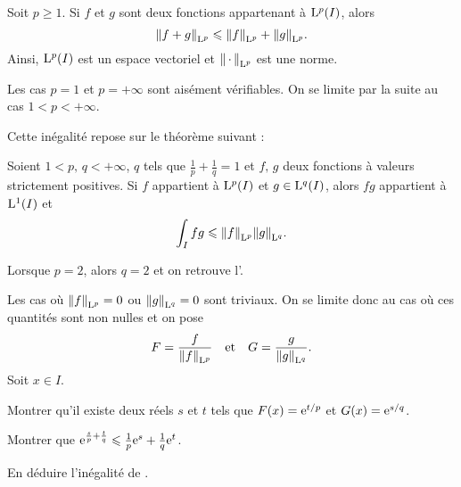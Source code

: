 \begin{theo}
Soit $p \geqslant 1$. Si $f$ et $g$ sont deux fonctions appartenant à $\mathrm{L}^p(I)$, alors
\[
\norm{f + g}_{\mathrm{L}^p} \leqslant \norm{f}_{\mathrm{L}^p} + \norm{g}_{\mathrm{L}^p}.
\]
Ainsi, $\mathrm{L}^p(I)$ est un espace vectoriel et $\norm{\,\cdot\,}_{\mathrm{L}^p}$ est une norme.
\end{theo}

\begin{remarque}
Les cas $p = 1$ et $p = +\infty$ sont aisément vérifiables. On se limite par la suite au cas $1 < p < +\infty$.
\end{remarque}

Cette inégalité repose sur le théorème suivant :
\begin{theo}
Soient $1 < p,\, q < +\infty$, $q$ tels que $\frac{1}{p} + \frac{1}{q} = 1$ et $f,\, g$ deux fonctions à valeurs strictement positives. Si $f$ appartient à $\mathrm{L}^p(I)$ et $g \in \mathrm{L}^q(I)$, alors $f g$ appartient à $\mathrm{L}^1(I)$ et
\[
\int_I f g \leqslant \norm{f}_{\mathrm{L}^p} \norm{g}_{\mathrm{L}^q}.
\]
\end{theo}

\begin{remarque}
Lorsque $p = 2$, alors $q = 2$ et on retrouve l'.
\end{remarque}

\begin{exercice}
Les cas où $\norm{f}_{\mathrm{L}^p} = 0$ ou $\norm{g}_{\mathrm{L}^q} = 0$ sont triviaux. On se limite donc au cas où ces quantités sont non nulles et on pose
\[
F = \frac{f}{\norm{f}_{\mathrm{L}^p}}
\quad \text{et} \quad
G = \frac{g}{\norm{g}_{\mathrm{L}^q}}.
\]
Soit $x \in I$.
\begin{questions}
\item Montrer qu'il existe deux réels $s$ et $t$ tels que $F(x) = \mathrm{e}^{t/p}$ et $G(x) = \mathrm{e}^{s/q}$.

\item Montrer que $\mathrm{e}^{\frac{s}{p} + \frac{t}{q}} \leqslant \frac{1}{p} \mathrm{e}^s + \frac{1}{q} \mathrm{e}^t$.

\item En déduire l'inégalité de .
\end{questions}
\end{exercice}

